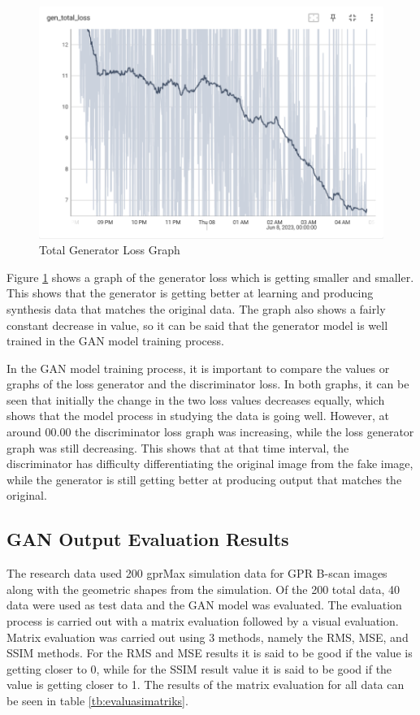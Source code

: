 \documentclass[conference]{IEEEtran}
\begin{document}
\begin{figure}[ht]
  \centering
  \includegraphics[scale=0.4]{gambar/Gen_total_loss.png}
  \caption{Total Generator Loss Graph}
  \label{fig:genLoss}
\end{figure}

Figure \ref{fig:genLoss} shows a graph of the generator loss which is getting smaller and smaller.
This shows that the generator is getting better at learning and producing synthesis data that matches the original data.
The graph also shows a fairly constant decrease in value, so it can be said that the generator model is well trained in the GAN model training process.

In the GAN model training process, it is important to compare the values or graphs of the loss generator and the discriminator loss.
In both graphs, it can be seen that initially the change in the two loss values decreases equally, which shows that the model process in studying the data is going well.
However, at around 00.00 the discriminator loss graph was increasing, while the loss generator graph was still decreasing.
This shows that at that time interval, the discriminator has difficulty differentiating the original image from the fake image, while the generator is still getting better at producing output that matches the original.

\subsection{GAN Output Evaluation Results}

The research data used 200 gprMax simulation data for GPR B-scan images along with the geometric shapes from the simulation.
Of the 200 total data, 40 data were used as test data and the GAN model was evaluated.
The evaluation process is carried out with a matrix evaluation followed by a visual evaluation.
Matrix evaluation was carried out using 3 methods, namely the RMS, MSE, and SSIM methods.
For the RMS and MSE results it is said to be good if the value is getting closer to 0, while for the SSIM result value it is said to be good if the value is getting closer to 1.
The results of the matrix evaluation for all data can be seen in table \ref{tb:evaluasimatriks}.
\end{document}
